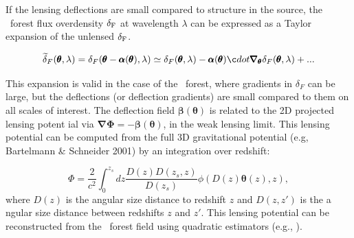 If the lensing deflections are small
compared to structure in the source, the \lya\ forest 
flux overdensity $\delta_{\rm F}$  at wavelength $\lambda$ can
be expressed as a Taylor expansion of the unlensed $\delta_{\rm F}$.

\begin{equation}
\widetilde{\delta}_{F}({ \pmb {\theta}},\lambda)=
{\delta_{F}}({ \pmb {\theta}} - {\pmb { \alpha}}({\pmb {\theta}}) ,\lambda)
\simeq {\delta_{F}} ({\pmb{\theta}},\lambda) - {\pmb {\alpha}}({\pmb{\theta}})\c
dot
{\pmb{\nabla_{\theta}}} \delta_{F} ({\pmb{\theta}},\lambda) + ...
\label{taylor}
\end{equation}

 This expansion is  valid in the case of the \lya\ forest, where gradients
in $\delta_{F}$ can be large, but the deflections (or deflection gradients) 
are small compared to them on all scales of interest. The deflection field
${\pmb {\beta}}( {\pmb {\theta}})$ is related to the 2D projected lensing potent
ial via
${\pmb {\nabla \Phi}} =- {\pmb {\beta}}({\pmb {\theta}} )$,
in the weak lensing limit. This lensing potential can be
computed from the full 3D gravitational
potential (e.g, Bartelmann \& Schneider 2001) by an integration
over redshift:

\begin{equation}
\Phi=\frac{2}{c^2}\int^{z_{s}}_{0}dz\frac{D(z)D(z_{s},z)}{D(z_{s})}\phi(D(z){\pmb {\theta}}(z),z),
\end{equation}
where $D(z)$ is the angular size distance to redshift $z$ and $D(z,z')$ is the a
ngular size distance between redshifts $z$ and $z'$. This lensing potential
can  be reconstructed from the \lya\ forest field using 
quadratic estimators (e.g., \cite{okamoto}).

